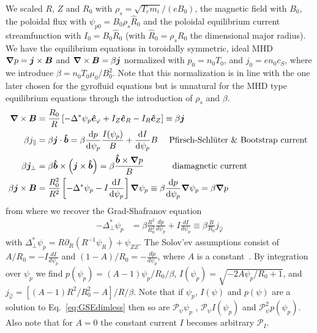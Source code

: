 We scaled $R$, $Z$ and $R_0$ with $\rho_s = \sqrt{T_e m_i}/(eB_0)$, the
magnetic field with $B_0$, the poloidal flux with $\psi_{p0} = B_0\rho_s \hat
R_0$ and the poloidal equilibrium current streamfunction with $I_0 = B_0 \hat R_0$ (with $\hat R_0 =
\rho_s R_0$ the dimensional major radius).
We have the equilibrium equations in toroidally symmetric, ideal MHD
${\boldsymbol{\nabla}} p = {\boldsymbol{j}}\times {\boldsymbol{B}}$ and ${\boldsymbol{\nabla}}\times{\boldsymbol{B}} = \beta {\boldsymbol{j}}$ normalized with $p_0 = n_0 T_0$, and $j_0 = e n_0 c_S$, where we introduce $\beta = n_0 T_0 \mu_0 /B_0^2$.
Note that this normalization is in line with the one later chosen for the gyrofluid
equations but is unnatural for the MHD type equilibrium equations through the introduction
of $\rho_s$ and $\beta$.
\begin{align}
    {\boldsymbol{\nabla}}\times {\boldsymbol{B}} &= \frac{R_0}{R}\left[ -\Delta^*\psi_p\bm{\hat{e}}_\varphi + I_Z \bm{\hat{e}}_R - I_R\bm{\hat{e}}_Z \right]\equiv \beta {\boldsymbol{j}}\\
 \beta j_\parallel &= \beta {\boldsymbol{j}}\cdot \bm{\hat{b}} = \beta \frac{\mathrm{d} p}{\mathrm{d}\psi_p} \frac{I(\psi_p)}{B} +
 \frac{\mathrm{d} I}{\mathrm{d}\psi_p} B \quad \text{  Pfirsch-Schl\"uter \& Bootstrap current } \\
 \beta {\boldsymbol{j}}_\perp &= \beta \bm{\hat{b}}\times\left({\boldsymbol{j}}\times\bm{\hat{b}}\right)=
 \beta \frac{\bm{\hat{b}} \times {\boldsymbol{\nabla}} p}{B} \quad\quad\quad \text{ diamagnetic current} \\
 \beta {\boldsymbol{j}}\times{\boldsymbol{B}} &= \frac{R_0^2}{R^2}\left[ -\Delta^* \psi_p - I
     \frac{\mathrm{d} I}{\mathrm{d} \psi_p} \right]{\boldsymbol{\nabla}}\psi_p \equiv \beta \frac{\mathrm{d} p}{\mathrm{d}\psi_p}{\boldsymbol{\nabla}}\psi_p =\beta {\boldsymbol{\nabla}} p
\end{align}
from where we recover the Grad-Shafranov equation
\begin{align}\label{eq:GSEdimless}
    -\Delta^*_\perp  \psi_p &= \beta \frac{R^2}{R_0^2} \frac{d p}{d  \psi_p } + I \frac{d I}{d  \psi_p } \equiv \beta \frac{R}{R_0} j_{\hat\varphi}
\end{align}
with $\Delta^*_\perp \psi_p = R\partial_R (R^{-1}\psi_R) + \psi_{ZZ}$.
The Solov'ev assumptions consist of \(A/R_0 = -I \frac{d I}{d  \psi_p }\) and \((1-A)/R_0 = -\frac{d p}{d  \psi_p }\), where \(A\) is a constant~\cite{Cerfon2010,Cerfon2014}.
By integration over \(\psi_p\) we find
$
 p(\psi_p) = (A-1)\psi_p/R_0/\beta$,
 $I(\psi_p) = \sqrt{-2 A \psi_p/R_0 + 1}$,
 and
    $j_{\hat\varphi} = \left[(A-1)R^2/R_0^2 - A \right]/R/\beta $.
Note that if $\psi_p$, $I(\psi)$ and $p(\psi)$ are a solution to Eq.~\eqref{eq:GSEdimless}
then so are $\mathcal P_\psi \psi_p$ , $\mathcal P_\psi I(\psi_p)$ and $\mathcal P_\psi^2 p(\psi_p)$.
Also note that for $A=0$ the constant current $I$ becomes arbitrary $\mathcal P_I$.

